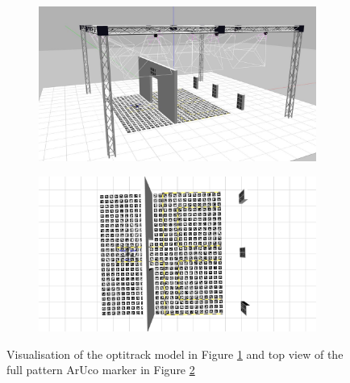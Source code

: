 \documentclass[../Head/report.tex]{subfiles}
\begin{document}
\begin{figure}[H]
    \centering
    \begin{subfigure}[t]{.48\textwidth}
        \centering
        \includegraphics[width=\textwidth]{../Figures/gazebo_full_pattern_view.jpg}
        \caption{}
        \label{fig:optitrack_full_pattern_aruco}
    \end{subfigure}
    \hfill
    \begin{subfigure}[t]{.48\textwidth}
        \centering
        \includegraphics[width=\textwidth]{../Figures/gazebo_full_pattern.jpg}
        \caption{}
        \label{fig:full_pattern_aruco}
    \end{subfigure}
    \caption{Visualisation of the optitrack model in Figure \ref{fig:optitrack_full_pattern_aruco} and top view of the full pattern ArUco marker in Figure \ref{fig:full_pattern_aruco}}
    \label{fig:three_pattern_aruco_fig}
\end{figure}
\end{document}
